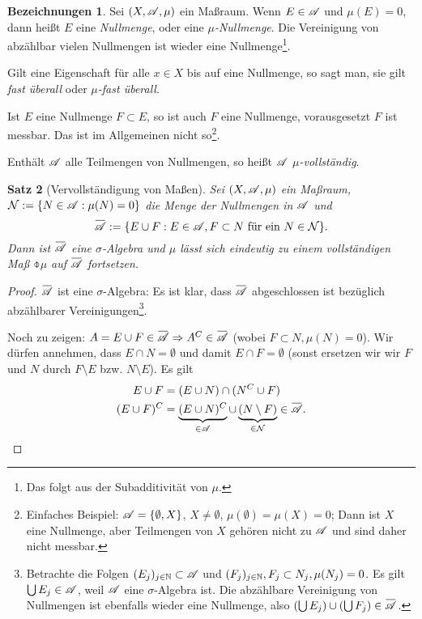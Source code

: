 \documentclass[
 a4paper,
 12pt,
 parskip=half
 ]{scrreprt}
\theoremstyle{plain}
\newtheorem{thm}{Satz}[section] %
\theoremstyle{definition}
\newtheorem{deno}[thm]{Bezeichnungen}
\numberwithin{equation}{section}
\begin{document}
\begin{deno}
 Sei $(X, \mathscr{A}, \mu)$ ein Maßraum. Wenn $E \in \mathscr{A}$ und $\mu(E) = 0$, dann heißt $E$ eine \emph{Nullmenge}, oder eine \emph{$\mu$-Nullmenge}. Die Vereinigung von abzählbar vielen Nullmengen ist wieder eine Nullmenge\footnote{Das folgt aus der Subadditivität von $\mu$.}.
 
 Gilt eine Eigenschaft für alle $x \in X$ bis auf eine Nullmenge, so sagt man, sie gilt \emph{fast überall} oder \emph{$\mu$-fast überall}.
 
 Ist $E$ eine Nullmenge $F \subset E$, so ist auch $F$ eine Nullmenge, vorausgesetzt $F$ ist messbar. Das ist im Allgemeinen nicht so\footnote{Einfaches Beispiel: $\mathscr{A} = \{ \emptyset, X \}$, $X \ne \emptyset$, $\mu( \emptyset ) = \mu(X) = 0$; Dann ist $X$ eine Nullmenge, aber Teilmengen von $X$ gehören nicht zu $\mathscr{A}$ und sind daher nicht messbar.}.
 
 Enthält $\mathscr{A}$ alle Teilmengen von Nullmengen, so heißt $\mathscr{A}$ \emph{$\mu$-vollständig}.
\end{deno}

\begin{thm}[Vervollständigung von Maßen]
 Sei $(X, \mathscr{A}, \mu)$ ein Maßraum, $\mathcal{N} := \{ N \in \mathscr{A}: \mu(N) = 0 \}$ die Menge der Nullmengen in $\mathscr{A}$ und 
 \[ \obar{\mA} := \{ E \cup F : E \in \mA, F \subset N \text{ für ein } N \in \mathcal{N} \}. \]
 Dann ist $\obar{\mA}$ eine $\sigma$-Algebra und $\mu$ lässt sich eindeutig zu einem vollständigen Maß $\obar{\mu}$ auf $\obar{\mA}$ fortsetzen.
\end{thm}

\begin{proof}
 $\obar{\mA}$ ist eine $\sigma$-Algebra: Es ist klar, dass $\obar{\mA}$ abgeschlossen ist bezüglich abzählbarer Vereinigungen\footnote{Betrachte die Folgen $(E_j)_{j \in \mathbb{N}} \subset \mathscr{A}$ und $(F_j)_{j \in \mathbb{N}}, F_j \subset N_j, \mu(N_j) = 0$. Es gilt $\bigcup E_j \in \mathscr{A}$, weil $\mathscr{A}$ eine $\sigma$-Algebra ist. Die abzählbare Vereinigung von Nullmengen ist ebenfalls wieder eine Nullmenge, also $(\bigcup E_j) \cup (\bigcup F_j) \in \obar{\mA}$.}.
 
 Noch zu zeigen: $A = E \cup F \in \obar{\mA} \Rightarrow A^C \in \obar{\mA}$ (wobei $F \subset N, \mu(N) = 0$). Wir dürfen annehmen, dass $E \cap N = \emptyset$ und damit $E \cap F = \emptyset$ (sonst ersetzen wir wir $F$ und $N$ durch $F \setminus E$ bzw. $N \setminus E$). Es gilt
 \begin{align*}
  E \cup F &= ( E \cup N ) \cap (N^C \cup F) \\
  (E \cup F)^C &= \underbrace{( E \cup N )^C}_{\in \mA} \cup \underbrace{(N \setminus F)}_{\in \mathcal{N}} \in \obar{\mA}. \qedhere
 \end{align*}
\end{proof}
\end{document}
